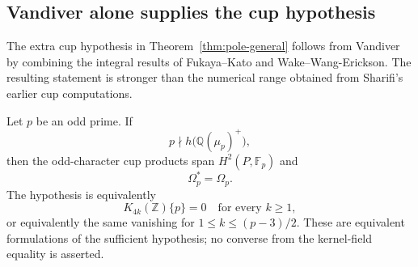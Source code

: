 \subsection{Vandiver alone supplies the cup hypothesis}
\label{sec:vandiver-kernel}

The extra cup hypothesis in Theorem~\ref{thm:pole-general} follows from
Vandiver by combining the integral results of Fukaya--Kato and
Wake--Wang-Erickson. The resulting statement is stronger than the numerical
range obtained from Sharifi's earlier cup computations.

\begin{theorem}\label{thm:vandiver-kernel}
Let $p$ be an odd prime. If
\[
 p\nmid h\bigl(\mathbb Q(\mu_p)^+\bigr),
\]
then the odd-character cup products span $H^2(P,\mathbb F_p)$ and
\[
 \Omega_p^*=\Omega_p.
\]
The hypothesis is equivalently
\[
 K_{4k}(\mathbb Z)\{p\}=0
 \quad\text{for every }k\ge1,
\]
or equivalently the same vanishing for $1\le k\le(p-3)/2$.
These are equivalent formulations of the sufficient hypothesis;
no converse from the kernel-field equality is asserted.
\end{theorem}

